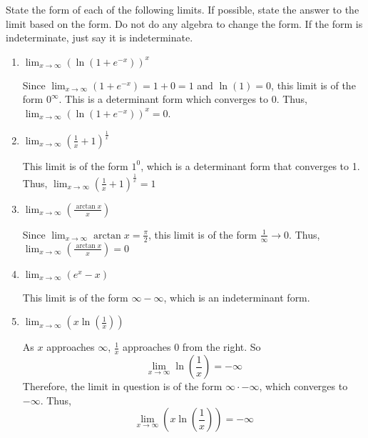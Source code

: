 \documentclass[nooutcomes]{ximera}
\begin{document}
\begin{problem}
State the form of each of the following limits.  If possible, state the answer to the limit based on the form.  Do not do any algebra to change the form.  If the form is indeterminate, just say it is indeterminate.
	\begin{enumerate}
	\item  $\lim_{x \to \infty}\left( \ln (1 + e^{-x}) \right)^x $
		\begin{freeResponse}
		Since $\lim_{x \to \infty} (1 + e^{-x}) = 1 + 0 = 1$ and $\ln (1) = 0$, this limit is of the form $0^{\infty}$.  This is a determinant form which converges to $0$.  Thus, $\lim_{x \to \infty} \left( \ln (1 + e^{-x}) \right)^x = 0$.
		\end{freeResponse}
		
	\item  $\lim_{x \to \infty} \left( \frac{1}{x} + 1 \right)^{\frac{1}{x}} $
		\begin{freeResponse}
		This limit is of the form $1^0$, which is a determinant form that converges to 1.  Thus, $\lim_{x \to \infty} \left( \frac{1}{x} + 1 \right)^{\frac{1}{x}} = 1 $
		\end{freeResponse}
		
	\item  $\lim_{x \to \infty} \left( \frac{\arctan x}{x} \right) $
		\begin{freeResponse}
		Since $\lim_{x \to \infty} \arctan x = \frac{\pi}{2}$, this limit is of the form $\frac{1}{\infty} \to 0$.  Thus, 
		$\lim_{x \to \infty} \left( \frac{\arctan x}{x} \right) = 0$  
		\end{freeResponse}
		
	\item  $\lim_{x \to \infty} (e^x - x) $
		\begin{freeResponse}
		This limit is of the form $\infty - \infty$, which is an indeterminant form.  
		\end{freeResponse}
		
	\item  $\lim_{x \to \infty} \left( x \ln \left( \frac{1}{x} \right) \right) $
		\begin{freeResponse}
		As $x$ approaches $\infty$, $\frac{1}{x}$ approaches $0$ from the right.  So 
		$$\lim_{x \to \infty} \ln \left( \frac{1}{x} \right) = - \infty $$
		Therefore, the limit in question is of the form $\infty \cdot - \infty$, which converges to $- \infty$.  Thus, 
		$$ \lim_{x \to \infty} \left( x \ln \left( \frac{1}{x} \right) \right) = - \infty $$
		\end{freeResponse}
		

\end{enumerate}
\end{problem}
\end{document}
